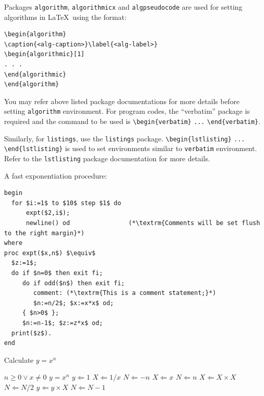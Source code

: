 \documentclass[lineno,pdflatex,sn-nature]{sn-jnl}%
\theoremstyle{thmstyleone}%
\theoremstyle{thmstyletwo}%
\theoremstyle{thmstylethree}%
\begin{document}
Packages \verb+algorithm+, \verb+algorithmicx+ and \verb+algpseudocode+ are used for setting algorithms in \LaTeX\ using the format:

\bigskip
\begin{verbatim}
\begin{algorithm}
\caption{<alg-caption>}\label{<alg-label>}
\begin{algorithmic}[1]
. . .
\end{algorithmic}
\end{algorithm}
\end{verbatim}
\bigskip

You may refer above listed package documentations for more details before setting \verb+algorithm+ environment. For program codes, the ``verbatim'' package is required and the command to be used is \verb+\begin{verbatim}+ \verb+...+ \verb+\end{verbatim}+. 

Similarly, for \verb+listings+, use the \verb+listings+ package. \verb+\begin{lstlisting}+ \verb+...+ \verb+\end{lstlisting}+ is used to set environments similar to \verb+verbatim+ environment. Refer to the \verb+lstlisting+ package documentation for more details.

A fast exponentiation procedure:

\begin{lstlisting}
begin
  for $i:=1$ to $10$ step $1$ do
      expt($2,i$);  
      newline() od                (*\textrm{Comments will be set flush to the right margin}*)
where
proc expt($x,n$) $\equiv$
  $z:=1$;
  do if $n=0$ then exit fi;
     do if odd($n$) then exit fi;                 
        comment: (*\textrm{This is a comment statement;}*)
        $n:=n/2$; $x:=x*x$ od;
     { $n>0$ };
     $n:=n-1$; $z:=z*x$ od;
  print($z$). 
end
\end{lstlisting}

\begin{algorithm}
\caption{Calculate $y = x^n$}\label{algo1}
\begin{algorithmic}[1]
\Require $n \geq 0 \vee x \neq 0$
\Ensure $y = x^n$ 
\State $y \Leftarrow 1$
\label{algln2}
        \State $X \Leftarrow 1 / x$
        \State $N \Leftarrow -n$
\Else
        \State $X \Leftarrow x$
        \State $N \Leftarrow n$
\EndIf
{}
            \State $X \Leftarrow X \times X$
            \State $N \Leftarrow N / 2$
        \Else[$N$ is odd]
            \State $y \Leftarrow y \times X$
            \State $N \Leftarrow N - 1$
        \EndIf
\EndWhile
\end{algorithmic}
\end{algorithm}
\end{document}
